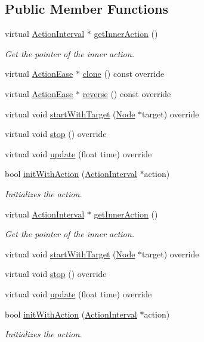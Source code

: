 \subsection*{Public Member Functions}
\begin{DoxyCompactItemize}
\item 
virtual \hyperlink{classActionInterval}{Action\+Interval} $\ast$ \hyperlink{classActionEase_aa024b3c9b78949381d06af515ffeaf9e}{get\+Inner\+Action} ()
\begin{DoxyCompactList}\small\item\em Get the pointer of the inner action. \end{DoxyCompactList}\item 
virtual \hyperlink{classActionEase}{Action\+Ease} $\ast$ \hyperlink{classActionEase_a39bec93fe161fb732a74d8e51a2fe08b}{clone} () const override
\item 
virtual \hyperlink{classActionEase}{Action\+Ease} $\ast$ \hyperlink{classActionEase_ab99eb083fa033fae1d6c948fdc730782}{reverse} () const override
\item 
virtual void \hyperlink{classActionEase_a04976f42219b97e850043ab9cd182918}{start\+With\+Target} (\hyperlink{classNode}{Node} $\ast$target) override
\item 
virtual void \hyperlink{classActionEase_a1a12083389f0bec7b1de3ef2c832597a}{stop} () override
\item 
virtual void \hyperlink{classActionEase_a77679f09c02cf75fb54776470c339fc5}{update} (float time) override
\item 
bool \hyperlink{classActionEase_a57660327c119242bbb1fe682fc723b5a}{init\+With\+Action} (\hyperlink{classActionInterval}{Action\+Interval} $\ast$action)
\begin{DoxyCompactList}\small\item\em Initializes the action. \end{DoxyCompactList}\item 
virtual \hyperlink{classActionInterval}{Action\+Interval} $\ast$ \hyperlink{classActionEase_ac26a5049b514d8824361a6e8eb6b2fc4}{get\+Inner\+Action} ()
\begin{DoxyCompactList}\small\item\em Get the pointer of the inner action. \end{DoxyCompactList}\item 
virtual void \hyperlink{classActionEase_a2b1a6fe2d83fe96723ca32c30301fda5}{start\+With\+Target} (\hyperlink{classNode}{Node} $\ast$target) override
\item 
virtual void \hyperlink{classActionEase_a2f9afe79f5848689a7f6f54c55764275}{stop} () override
\item 
virtual void \hyperlink{classActionEase_afaef2afc55ebf4e8d6897c3cb1977c1e}{update} (float time) override
\item 
bool \hyperlink{classActionEase_a57660327c119242bbb1fe682fc723b5a}{init\+With\+Action} (\hyperlink{classActionInterval}{Action\+Interval} $\ast$action)
\begin{DoxyCompactList}\small\item\em Initializes the action. \end{DoxyCompactList}\end{DoxyCompactItemize}
